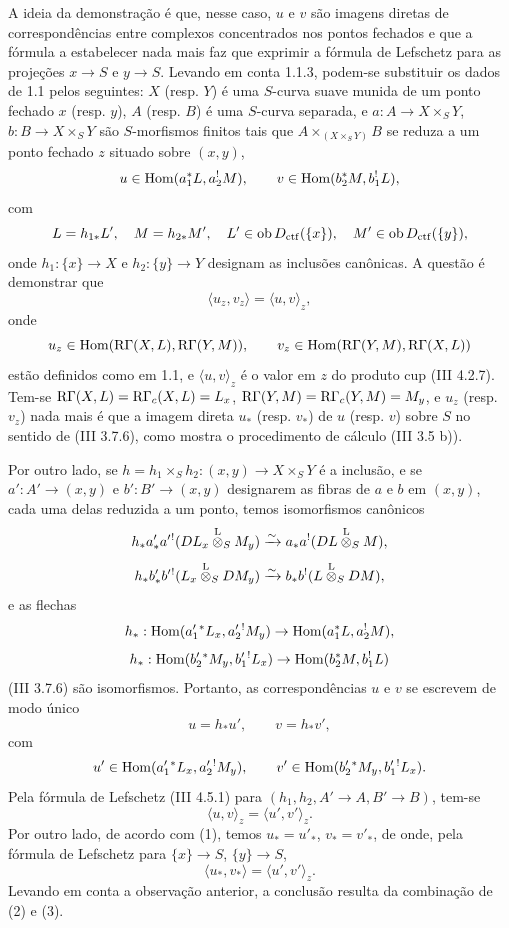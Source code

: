 A ideia da demonstração é que, nesse caso, $u$ e $v$ são imagens diretas de correspondências entre complexos concentrados nos pontos fechados e que a fórmula a estabelecer nada mais faz que exprimir a fórmula de Lefschetz para as projeções $x\to S$ e $y\to S$. Levando em conta 1.1.3, podem-se substituir os dados de 1.1 pelos seguintes: $X$ (resp. $Y$) é uma $S$-curva suave munida de um ponto fechado $x$ (resp. $y$), $A$ (resp. $B$) é uma $S$-curva separada, e $a:A\to X\times_S Y$, $b:B\to X\times_S Y$ são $S$-morfismos finitos tais que $A\times_{(X\times_SY)}B$ se reduza a um ponto fechado $z$ situado sobre $(x,y)$,
\[
u\in\operatorname{Hom}(a_1^*L,a_2^!M),\qquad v\in\operatorname{Hom}(b_2^*M,b_1^!L),
\]
com
\[
L=h_{1*}L',\quad M=h_{2*}M',\quad
L'\in\operatorname{ob} D_{\mathrm{ctf}}(\{x\}),\quad M'\in\operatorname{ob} D_{\mathrm{ctf}}(\{y\}),
\]
onde $h_1:\{x\}\to X$ e $h_2:\{y\}\to Y$ designam as inclusões canônicas. A questão é demonstrar que
\[
\langle u_z,v_z\rangle=\langle u,v\rangle_z,
\]
onde
\[
u_z\in\operatorname{Hom}(\mathrm{R}\Gamma(X,L),\mathrm{R}\Gamma(Y,M)),\qquad
v_z\in\operatorname{Hom}(\mathrm{R}\Gamma(Y,M),\mathrm{R}\Gamma(X,L))
\]
estão definidos como em 1.1, e $\langle u,v\rangle_z$ é o valor em $z$ do produto cup (III 4.2.7). Tem-se $\mathrm{R}\Gamma(X,L)=\mathrm{R}\Gamma_c(X,L)=L_x$, $\mathrm{R}\Gamma(Y,M)=\mathrm{R}\Gamma_c(Y,M)=M_y$, e $u_z$ (resp. $v_z$) nada mais é que a imagem direta $u_*$ (resp. $v_*$) de $u$ (resp. $v$) sobre $S$ no sentido de (III 3.7.6), como mostra o procedimento de cálculo (III 3.5 b)).

Por outro lado, se $h=h_1\times_Sh_2:(x,y)\to X\times_SY$ é a inclusão, e se $a':A'\to(x,y)$ e $b':B'\to(x,y)$ designarem as fibras de $a$ e $b$ em $(x,y)$, cada uma delas reduzida a um ponto, temos isomorfismos canônicos
\[
h_*a'_*a'{}^!(DL_x\overset{\mathrm L}{\otimes}_SM_y)
 \xrightarrow{\sim} a_*a^!(DL\overset{\mathrm L}{\otimes}_SM),
\]
\[
h_*b'_*b'{}^!(L_x\overset{\mathrm L}{\otimes}_SDM_y)
 \xrightarrow{\sim} b_*b^!(L\overset{\mathrm L}{\otimes}_SDM),
\]
e as flechas
\[
h_*:\operatorname{Hom}(a_1'{}^*L_x,a_2'{}^!M_y)\to \operatorname{Hom}(a_1^*L,a_2^!M),
\]
\[
h_*:\operatorname{Hom}(b_2'{}^*M_y,b_1'{}^!L_x)\to \operatorname{Hom}(b_2^*M,b_1^!L)
\]
(III 3.7.6) são isomorfismos. Portanto, as correspondências $u$ e $v$ se escrevem de modo único
\begin{equation}\tag{1}
u=h_*u',\qquad v=h_*v',
\end{equation}
com
\[
u'\in\operatorname{Hom}(a_1'{}^*L_x,a_2'{}^!M_y),\qquad
v'\in\operatorname{Hom}(b_2'{}^*M_y,b_1'{}^!L_x).
\]
Pela fórmula de Lefschetz (III 4.5.1) para $(h_1,h_2,A'\to A,B'\to B)$, tem-se
\begin{equation}\tag{2}
\langle u,v\rangle_z=\langle u',v'\rangle_z .
\end{equation}
Por outro lado, de acordo com (1), temos $u_*=u'_*$, $v_*=v'_*$, de onde, pela fórmula de Lefschetz para $\{x\}\to S$, $\{y\}\to S$,
\begin{equation}\tag{3}
\langle u_*,v_*\rangle=\langle u',v'\rangle_z .
\end{equation}
Levando em conta a observação anterior, a conclusão resulta da combinação de (2) e (3).
